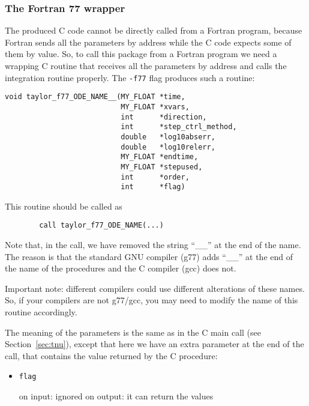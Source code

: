 \documentclass{article}
\begin{document}
{\subsubsection{The Fortran 77 wrapper}\label{sec:f77}
The produced C code cannot be directly called from a Fortran program,
because Fortran sends all the parameters by address while the C code
expects some of them by value. So, to call this package from a Fortran
program we need a wrapping C routine that receives all the parameters 
by address and calls the integration routine properly. The {\tt -f77}
flag produces such a routine:
\begin{verbatim}
void taylor_f77_ODE_NAME__(MY_FLOAT *time,
                           MY_FLOAT *xvars,
                           int      *direction,
                           int      *step_ctrl_method,
                           double   *log10abserr,
                           double   *log10relerr,
                           MY_FLOAT *endtime,
                           MY_FLOAT *stepused,
                           int      *order,
                           int      *flag)
\end{verbatim}
This routine should be called as
\begin{verbatim}
        call taylor_f77_ODE_NAME(...)
\end{verbatim}
Note that, in the call, we have removed the string ``\_\_'' at the end
of the name. The reason is that the standard GNU compiler (g77) adds
``\_\_'' at the end of the name of the procedures and the C compiler
(gcc) does not.

Important note: different compilers could use different alterations of
these names. So, if your compilers are not g77/gcc, you may need to
modify the name of this routine accordingly.

The meaning of the parameters is the same as in the C main call (see
Section~\ref{sec:tnu}), except that here we have an extra parameter at
the end of the call, that contains the value returned by the C
procedure:
\begin{itemize}
\item {\tt flag}

  on input: ignored\newline
  on output: it can return the values
\end{itemize}


}
\end{document}
